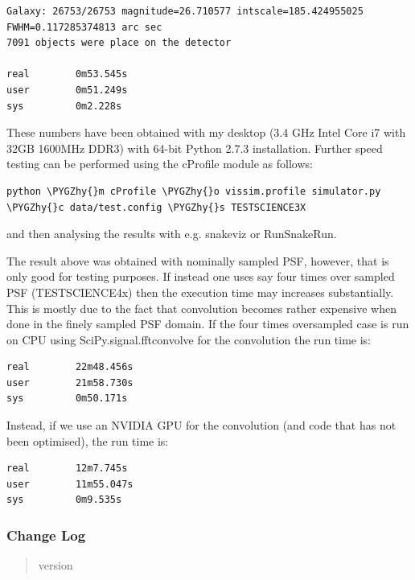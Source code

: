 \documentclass[a4paper,11pt,english]{sphinxmanual}
\def\PYGZhy{\char`\-}
\begin{document}
\begin{Verbatim}[commandchars=\\\{\}]
Galaxy: 26753/26753 magnitude=26.710577 intscale=185.424955025 FWHM=0.117285374813 arc sec
7091 objects were place on the detector

real        0m53.545s
user        0m51.249s
sys         0m2.228s
\end{Verbatim}

These numbers have been obtained with my desktop (3.4 GHz Intel Core i7 with 32GB 1600MHz DDR3) with
64-bit Python 2.7.3 installation. Further speed testing can be performed using the cProfile module
as follows:

\begin{Verbatim}[commandchars=\\\{\}]
python \PYGZhy{}m cProfile \PYGZhy{}o vissim.profile simulator.py \PYGZhy{}c data/test.config \PYGZhy{}s TESTSCIENCE3X
\end{Verbatim}

and then analysing the results with e.g. snakeviz or RunSnakeRun.

The result above was obtained with nominally sampled PSF, however, that is only good for
testing purposes. If instead one uses say four times over sampled PSF (TESTSCIENCE4x) then the
execution time may increases substantially. This is mostly due to the fact that convolution
becomes rather expensive when done in the finely sampled PSF domain. If the four times oversampled case
is run on CPU using SciPy.signal.fftconvolve for the convolution the run time is:

\begin{Verbatim}[commandchars=\\\{\}]
real        22m48.456s
user        21m58.730s
sys         0m50.171s
\end{Verbatim}

Instead, if we use an NVIDIA GPU for the convolution (and code that has not been optimised), the run time is:

\begin{Verbatim}[commandchars=\\\{\}]
real        12m7.745s
user        11m55.047s
sys         0m9.535s
\end{Verbatim}


\subsubsection{Change Log}
\label{simulator:change-log}\begin{quote}\begin{description}
\item[{version}] 

\end{description}\end{quote}
\end{document}
